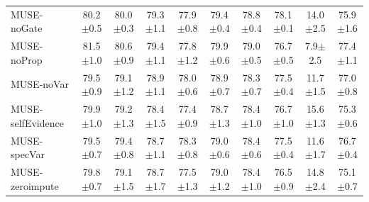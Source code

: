 \begin{tabular}{lccccccccc}
MUSE-noGate & 80.2$\pm$0.5 & 80.0$\pm$0.3 & 79.3$\pm$1.1 & 77.9$\pm$0.8 & 79.4$\pm$0.4 & 78.8$\pm$0.4 & 78.1$\pm$0.1 & 14.0$\pm$2.5 & 75.9$\pm$1.6 \\
MUSE-noProp & 81.5$\pm$1.0 & 80.6$\pm$0.9 & 79.4$\pm$1.1 & 77.8$\pm$1.2 & 79.9$\pm$0.6 & 79.0$\pm$0.5 & 76.7$\pm$0.5 & 7.9$\pm$2.5 & 77.4$\pm$1.1 \\
MUSE-noVar & 79.5$\pm$0.9 & 79.1$\pm$1.2 & 78.9$\pm$1.1 & 78.0$\pm$0.6 & 78.9$\pm$0.7 & 78.3$\pm$0.7 & 77.5$\pm$0.4 & 11.7$\pm$1.5 & 77.0$\pm$0.8 \\
MUSE-selfEvidence & 79.9$\pm$1.0 & 79.2$\pm$1.3 & 78.4$\pm$1.5 & 77.4$\pm$0.9 & 78.7$\pm$1.3 & 78.4$\pm$1.0 & 76.7$\pm$1.0 & 15.6$\pm$1.3 & 75.3$\pm$0.6 \\
MUSE-specVar & 79.5$\pm$0.7 & 79.4$\pm$0.8 & 78.7$\pm$1.1 & 78.3$\pm$0.8 & 79.0$\pm$0.6 & 78.4$\pm$0.6 & 77.5$\pm$0.4 & 11.6$\pm$1.7 & 76.7$\pm$0.4 \\
MUSE-zeroimpute & 79.8$\pm$0.7 & 79.1$\pm$1.5 & 78.7$\pm$1.7 & 77.5$\pm$1.3 & 79.0$\pm$1.2 & 78.4$\pm$1.0 & 76.5$\pm$0.9 & 14.8$\pm$2.4 & 75.1$\pm$0.7 \\
\bottomrule
\end{tabular}
